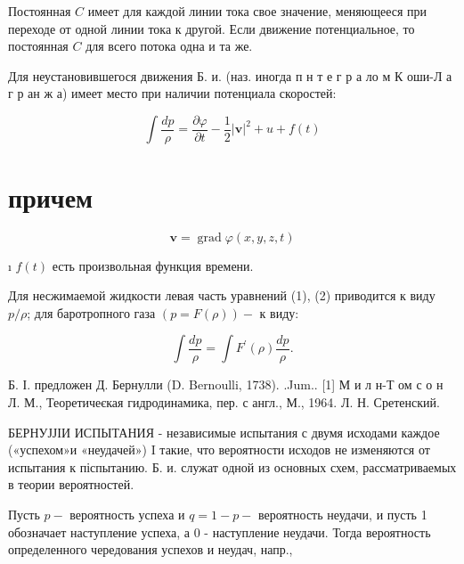 \documentclass[10pt]{article}
\begin{document}
Постоянная $C$ имеет для каждой линии тока свое значение, меняющееся при переходе от одной линии тока к другой. Если движение потенциальное, то постоянная $C$ для всего потока одна и та же.



Для неустановившегося движения Б. и. (наз. иногда п н т е г р а ло м К оши-Л а г р ан ж а) имеет место при наличии потенциала скоростей:



\[

\int \frac{d p}{\rho}=\frac{\partial \varphi}{\partial t}-\frac{1}{2}|\boldsymbol{v}|^{2}+u+f(t)

\]



\section{причем}

\[

\boldsymbol{v}=\operatorname{grad} \varphi(x, y, z, t)

\]



ı $f(t)$ есть произвольная функция времени.



Для несжимаемой жидкости левая часть уравнений (1), (2) приводится к виду $p / \rho$; для баротропного газа $(p=F(\rho))-$ к виду:



\[

\int \frac{d p}{\rho}=\int F^{\prime}(\rho) \frac{d p}{\rho} .

\]



Б. І. предложен Д. Бернулли (D. Bernoulli, 1738). .Jum.. [1] М и л н-Т ом с о н Л. М., Теоретичеєкая гидродинамика, пер. с англ., М., 1964. Л. Н. Сретенский.



БЕРНУЈЈІИ ИСПЫТАНИЯ - независимые испытания с двумя исходами каждое («успехом»и «неудачей») I такие, что вероятности исходов не изменяются от испытания к піспытанию. Б. и. служат одной из основных схем, рассматриваемых в теории вероятностей.



Пусть $p-$ вероятность успеха и $q=1-p-$ вероятность неудачи, и пусть 1 обозначает наступление успеха, а 0 - наступление неудачи. Тогда вероятность определенного чередования успехов и неудач, напр.,
\end{document}
